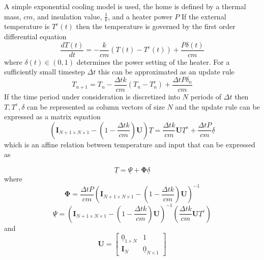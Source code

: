 \documentclass[a4paper, 10 pt, conference]{ieeeconf}  %
\begin{document}
A simple exponential cooling model is used, the home is defined by a thermal mass, $cm$, and insulation value, $\frac{1}{k}$, and a heater power $P$ If the external temperature is $T^{e}(t)$ then the temperature is governed by the first order differential equation
\begin{equation}
\frac{dT(t)}{dt} = -\frac{k}{cm}(T(t)-T^{e}(t)) +\frac{P\delta(t)}{cm}
\end{equation}
where $\delta(t) \in (0,1)$ determines the power setting of the heater. For a sufficiently small timestep $\Delta t$  this can be approximated as an update rule
\begin{equation}
T_{n+1} =  T_{n}-\frac{\Delta t k}{cm}(T_{n}-T_{n}^{e}) + \frac{\Delta t P \delta_{n}}{cm} 
\end{equation}
If the time period under consideration is discretized into $N$ periods of $\Delta t$ then $T, T^{e},\delta$ can be represented as column vectors of size $N$ and the update rule can be expressed as a matrix equation
\begin{equation}
\left( \mathbf{I}_{N+1 \times N \times 1}-(1-\frac{\Delta t k}{cm})\mathbf{U}\right) \underline{T} = \frac{\Delta t k}{cm}\mathbf{U}\underline{T}^{e}+\frac{\Delta t P}{cm}\underline{\delta}
\end{equation}
which is an affine relation between temperature and input that can be expressed as

\begin{equation}
\underline{T}=\underline{\Psi}+\boldsymbol{\Phi} \underline{\delta}
\end{equation}
where
\begin{equation}
\boldsymbol{\Phi}= \frac{\Delta t P}{cm} \left( \mathbf{I}_{N+1 \times N \times 1}-(1-\frac{\Delta t k}{cm})\mathbf{U}\right)^{-1}
\end{equation}
\begin{equation}
\underline{\Psi}= \left( \mathbf{I}_{N+1 \times N \times 1}-(1-\frac{\Delta t k}{cm})\mathbf{U}\right)^{-1} \left( \frac{\Delta t k}{cm}\mathbf{U}\underline{T}^{e}\right)
\end{equation}
and
\begin{equation}
\mathbf{U} = \left[
\begin{array}{c|c}
\underline{0}_{1\times N} & 1 \\ \hline
\mathbf{I}_{N} & \underline{0}_{N \times 1}
\end{array}\right]
\end{equation}
\end{document}
